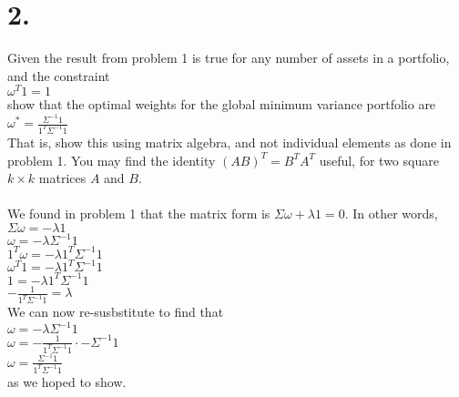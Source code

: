 \documentclass{article}
\begin{document}
\section*{2.}
{\Large

Given the result from problem 1 is true for any number of assets in a portfolio, and the constraint \\ 
$\omega^T1 = 1$ \\
show that the optimal weights for the global minimum variance portfolio are \\ 
$\omega^* = \frac{\Sigma^{-1}1}{1^T\Sigma^{-1}1}$ \\
That is, show this using matrix algebra, and not individual elements as done in problem 1. You may find the identity $(AB)^T = B^TA^T$ useful, for two square $k \times k$ matrices $A$ and $B$. \\ \\

We found in problem 1 that the matrix form is $\Sigma \omega + \lambda 1 = 0$. In other words, \\
$\Sigma \omega = -\lambda1$ \\
$\omega = -\lambda\Sigma^{-1}1$ \\
$1^T\omega = -\lambda1^T\Sigma^{-1}1$ \\
$\omega^T1 = -\lambda1^T\Sigma^{-1}1$ \\
$1 = -\lambda1^T\Sigma^{-1}1$ \\
$-\frac{1}{1^T\Sigma^{-1}1} = \lambda$ \\ 
We can now re-susbstitute to find that \\ 
$\omega = -\lambda\Sigma^{-1}1$ \\
$\omega = -\frac{1}{1^T\Sigma^{-1}1} \cdot -\Sigma^{-1}1$ \\ 
$\omega = \frac{\Sigma^{-1}1}{1^T\Sigma^{-1}1}$ \\
as we hoped to show.

}
\end{document}
